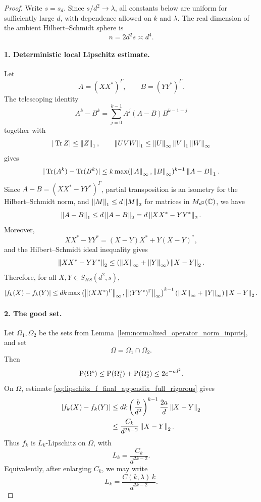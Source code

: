 \begin{proof}
Write \(s=s_d\).  Since \(s/d^2\to\lambda\), all constants below are uniform
for sufficiently large \(d\), with dependence allowed on \(k\) and
\(\lambda\).  The real dimension of the ambient Hilbert--Schmidt sphere is
\[
    n=2d^2s\asymp d^4.
\]

\paragraph{1. Deterministic local Lipschitz estimate.}
Let
\[
    A=(XX^*)^\Gamma,\qquad B=(YY^*)^\Gamma.
\]
The telescoping identity
\[
    A^k-B^k=\sum_{j=0}^{k-1}A^j(A-B)B^{k-1-j}
\]
together with
\[
    |\operatorname{Tr} Z|\le\left\lVert Z\right\rVert_1,
    \qquad
    \left\lVert UVW\right\rVert_1\le\left\lVert U\right\rVert_\infty\left\lVert V\right\rVert_1\left\lVert W\right\rVert_\infty
\]
gives
\[
    |\operatorname{Tr}(A^k)-\operatorname{Tr}(B^k)|
    \le
    k\max(\left\lVert A\right\rVert_\infty,\left\lVert B\right\rVert_\infty)^{k-1}\left\lVert A-B\right\rVert_1.
\]
Since \(A-B=(XX^*-YY^*)^\Gamma\), partial transposition is an isometry for the
Hilbert--Schmidt norm, and \(\left\lVert M\right\rVert_1\le d\left\lVert M\right\rVert_2\) for matrices in
\(M_{d^2}(\mathbb{C})\), we have
\[
    \left\lVert A-B\right\rVert_1
    \le d\left\lVert A-B\right\rVert_2
    =
    d\left\lVert XX^*-YY^*\right\rVert_2.
\]
Moreover,
\[
    XX^*-YY^*=(X-Y)X^*+Y(X-Y)^*,
\]
and the Hilbert--Schmidt ideal inequality gives
\[
    \left\lVert XX^*-YY^*\right\rVert_2
    \le
    (\left\lVert X\right\rVert_\infty+\left\lVert Y\right\rVert_\infty)\left\lVert X-Y\right\rVert_2.
\]
Therefore, for all \(X,Y\in S_{HS}(d^2,s)\),
\begin{equation}
\label{eq:lipschitz_f_final_appendix_full_rigorous}
    |f_k(X)-f_k(Y)|
    \le
    dk\max\left(
      \left\lVert(XX^*)^\Gamma\right\rVert_\infty,
      \left\lVert(YY^*)^\Gamma\right\rVert_\infty
    \right)^{k-1}
    (\left\lVert X\right\rVert_\infty+\left\lVert Y\right\rVert_\infty)\left\lVert X-Y\right\rVert_2.
\end{equation}

\paragraph{2. The good set.}
Let \(\Omega_1,\Omega_2\) be the sets from
Lemma~\ref{lem:normalized_operator_norm_inputs}, and set
\[
    \Omega=\Omega_1\cap\Omega_2.
\]
Then
\[
    \operatorname{P}(\Omega^c)
    \le \operatorname{P}(\Omega_1^c)+\operatorname{P}(\Omega_2^c)
    \le 2e^{-cd^2}.
\]
On \(\Omega\), estimate
\eqref{eq:lipschitz_f_final_appendix_full_rigorous} gives
\[
\begin{aligned}
    |f_k(X)-f_k(Y)|
    &\le
    dk\left(\frac{b}{d^2}\right)^{k-1}
    \frac{2a}{d}\left\lVert X-Y\right\rVert_2  \\
    &\le
    \frac{C_k}{d^{2k-2}}\left\lVert X-Y\right\rVert_2.
\end{aligned}
\]
Thus \(f_k\) is \(L_k\)-Lipschitz on \(\Omega\), with
\[
    L_k=\frac{C_k}{d^{2k-2}}.
\]
Equivalently, after enlarging \(C_k\), we may write
\[
    L_k=\frac{C(k,\lambda)\,k}{d^{2k-2}}.
\]


\end{proof}

